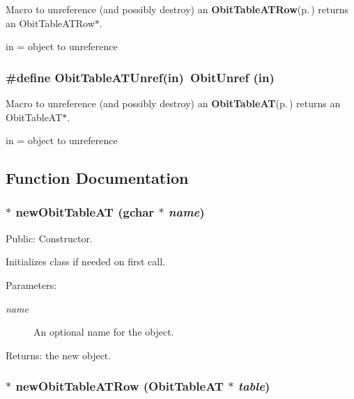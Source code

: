 Macro to unreference (and possibly destroy) an {\bf Obit\-Table\-ATRow}{\rm (p.\,\pageref{structObitTableATRow})} returns an Obit\-Table\-ATRow$\ast$. 

in = object to unreference 
\subsubsection{\setlength{\rightskip}{0pt plus 5cm}\#define Obit\-Table\-ATUnref(in)\ Obit\-Unref (in)}\label{ObitTableAT_8h_a1}


Macro to unreference (and possibly destroy) an {\bf Obit\-Table\-AT}{\rm (p.\,\pageref{structObitTableAT})} returns an Obit\-Table\-AT$\ast$. 

in = object to unreference 

\subsection{Function Documentation}
\subsubsection{$\ast$ new\-Obit\-Table\-AT (gchar $\ast$ {\em name})}\label{ObitTableAT_8h_a11}


Public: Constructor. 

Initializes class if needed on first call. \begin{Desc}
\item[Parameters:]
\begin{description}
\item[{\em name}]An optional name for the object. \end{description}
\end{Desc}
\begin{Desc}
\item[Returns:]the new object. \end{Desc}
\subsubsection{$\ast$ new\-Obit\-Table\-ATRow ({\bf Obit\-Table\-AT} $\ast$ {\em table})}\label{ObitTableAT_8h_a8}


